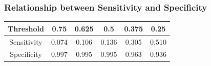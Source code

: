 \begin{frame}
\frametitle{Relationship between Sensitivity and Specificity}

{\footnotesize
\begin{center}
\begin{tabular}{|c|ccccc|}
\hline
Threshold   & 0.75 & 0.625 & 0.5 & 0.375 & 0.25 \\
\hline
Sensitivity & 0.074 & 0.106 & 0.136 & 0.305 & 0.510 \\
Specificity & 0.997 & 0.995 & 0.995 & 0.963 & 0.936 \\
\hline
\end{tabular}
\end{center}
}


\begin{center}
\end{center}

\end{frame}

